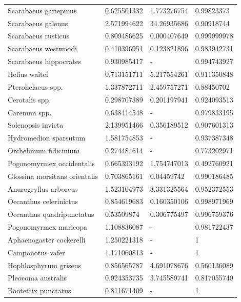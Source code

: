 \documentclass{article}
\begin{document}
\begin{table}[h]
\begin{tabular}{llll}
Scarabaeus gariepinus           & 0.625501332 & 1.773276754 & 0.99823373  \\
Scarabaeus galenus              & 2.571994622 & 34.26935686 & 0.90918744  \\
Scarabaeus rusticus             & 0.809486625 & 0.000407649 & 0.999999978 \\
Scarabaeus westwoodi            & 0.410396951 & 0.123821896 & 0.983942731 \\
Scarabaeus hippocrates          & 0.930985417 & -           & 0.994743927 \\
Helius waitei                   & 0.713151711 & 5.217554261 & 0.911350848 \\
Pterohelaeus spp.               & 1.337872711 & 2.459757271 & 0.88450702  \\
Cerotalis spp.                  & 0.298707389 & 0.201197941 & 0.924093513 \\
Carenum spp.                    & 0.638414548 & -           & 0.979833195 \\
Solenopsis invicta              & 2.139951466 & 0.356189512 & 0.907601313 \\
Hydromedion sparsutum           & 1.581754853 & -           & 0.937387348 \\
Orchelimum fidicinium           & 0.274484614 & -           & 0.773202971 \\
Pogonomyrmex occidentalis       & 0.665393192 & 1.754747013 & 0.492760921 \\
Glossina morsitans orientalis   & 0.703865161 & 0.04459742  & 0.990186485 \\
Anurogryllus arboreus           & 1.523104973 & 3.331325564 & 0.952372553 \\
Oecanthus celerinictus          & 0.854619683 & 0.160350106 & 0.998971969 \\
Oecanthus quadripunctatus       & 0.53509874  & 0.306775497 & 0.996759376 \\
Pogonomyrmex maricopa           & 1.108836087 & -           & 0.981722437 \\
Aphaenogaster cockerelli        & 1.250221318 & -           & 1           \\
Camponotus vafer                & 1.171060813 & -           & 1           \\
Hophlosphyrum griseus           & 0.856565787 & 4.691078676 & 0.560136089 \\
Pleocoma australis              & 0.924353735 & 3.745589741 & 0.817055749 \\
Bootettix punctatus             & 0.811671409 & -           & 1           \\

\end{tabular}
\end{table}
\end{document}
